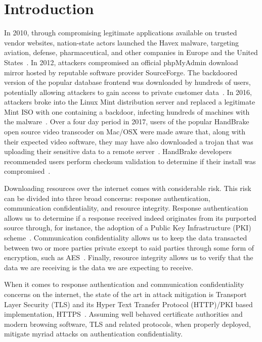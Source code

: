 \section{Introduction} \label{sec:introduction}

In 2010, through compromising legitimate applications available on trusted
vendor websites, nation-state actors launched the Havex malware, targeting
aviation, defense, pharmaceutical, and other companies in Europe and the United
States~\cite{SCA-HAVEX1, SCA-HAVEX2}. In 2012, attackers compromised an official
phpMyAdmin download mirror hosted by reputable software provider SourceForge.
The backdoored version of the popular database frontend was downloaded by
hundreds of users, potentially allowing attackers to gain access to private
customer data~\cite{SCA-PMA1, SCA-PMA2}. In 2016, attackers broke into the Linux
Mint distribution server and replaced a legitimate Mint ISO with one containing
a backdoor, infecting hundreds of machines with the malware~\cite{SCA-MINT1,
SCA-MINT2}. Over a four day period in 2017, users of the popular HandBrake open
source video transcoder on Mac/OSX were made aware that, along with their
expected video software, they may have also downloaded a trojan that was
uploading their sensitive data to a remote server~\cite{SCA-HB1}. HandBrake
developers recommended users perform checksum validation to determine if their
install was compromised~\cite{SCA-HB2}.

Downloading resources over the internet comes with considerable risk. This risk
can be divided into three broad concerns: response authentication, communication
confidentiality, and resource integrity. Response authentication allows us to
determine if a response received indeed originates from its purported source
through, for instance, the adoption of a Public Key Infrastructure (PKI)
scheme~\cite{PKI}. Communication confidentiality allows us to keep the data
transacted between two or more parties private except to said parties through
some form of encryption, such as AES~\cite{AES}. Finally, resource integrity
allows us to verify that the data we are receiving is the data we are expecting
to receive.

When it comes to response authentication and communication confidentiality
concerns on the internet, the state of the art in attack mitigation is Transport
Layer Security (TLS) and its Hyper Text Transfer Protocol (HTTP)/PKI based
implementation, HTTPS~\cite{TLS1.2, TLS1, TLS0, HTTPS, PKI}. Assuming well
behaved certificate authorities and modern browsing software, TLS and related
protocols, when properly deployed, mitigate myriad attacks on authentication
confidentiality.

